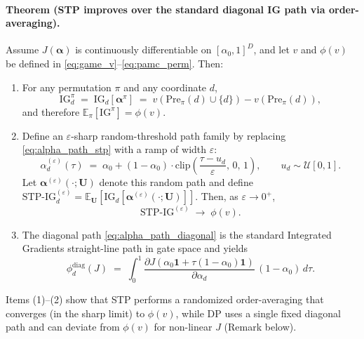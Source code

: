 \paragraph{Theorem (STP improves over the standard diagonal IG path via order-averaging).}
Assume $J(\boldsymbol{\alpha})$ is continuously differentiable on $[\alpha_0,1]^D$, and let $v$ and $\phi(v)$ be defined in \eqref{eq:game_v}--\eqref{eq:pamc_perm}.
Then:
\begin{enumerate}
\item For any permutation $\pi$ and any coordinate $d$,
\begin{equation}
\mathrm{IG}^{\pi}_d \;=\; \mathrm{IG}_d[\boldsymbol{\alpha}^{\pi}] \;=\; v(\mathrm{Pre}_{\pi}(d)\cup\{d\})-v(\mathrm{Pre}_{\pi}(d)),
\label{eq:ig_perm_equals_marginal}
\end{equation}
and therefore $\mathbb{E}_{\pi}[\mathrm{IG}^{\pi}] = \phi(v)$.
\item Define an $\varepsilon$-sharp random-threshold path family by replacing \eqref{eq:alpha_path_stp} with a ramp of width $\varepsilon$:
\[
\alpha^{(\varepsilon)}_d(\tau)
\;=\;
\alpha_0 + (1-\alpha_0)\cdot \mathrm{clip}\!\left(\frac{\tau-u_d}{\varepsilon},\,0,\,1\right),
\qquad u_d \sim \mathcal{U}[0,1].
\]
Let $\boldsymbol{\alpha}^{(\varepsilon)}(\cdot;\mathbf{U})$ denote this random path and define $\mathrm{STP}\text{-}\mathrm{IG}^{(\varepsilon)}_d = \mathbb{E}_{\mathbf{U}}[\mathrm{IG}_d[\boldsymbol{\alpha}^{(\varepsilon)}(\cdot;\mathbf{U})]]$. Then, as $\varepsilon \to 0^+$,
\begin{equation}
\mathrm{STP}\text{-}\mathrm{IG}^{(\varepsilon)}
\;\to\;
\phi(v).
\label{eq:stp_to_pamc}
\end{equation}
\item The diagonal path \eqref{eq:alpha_path_diagonal} is the standard Integrated Gradients straight-line path in gate space and yields
\begin{equation}
\phi^{\mathrm{diag}}_d(J)
\;=\;
\int_0^1 \frac{\partial J(\alpha_0\mathbf{1}+\tau(1-\alpha_0)\mathbf{1})}{\partial \alpha_d}\,(1-\alpha_0)\,d\tau.
\label{eq:diag_value_dp}
\end{equation}
\end{enumerate}
Items (1)--(2) show that STP performs a randomized order-averaging that converges (in the sharp limit) to $\phi(v)$, while DP uses a single fixed diagonal path and can deviate from $\phi(v)$ for non-linear $J$ (Remark below).

